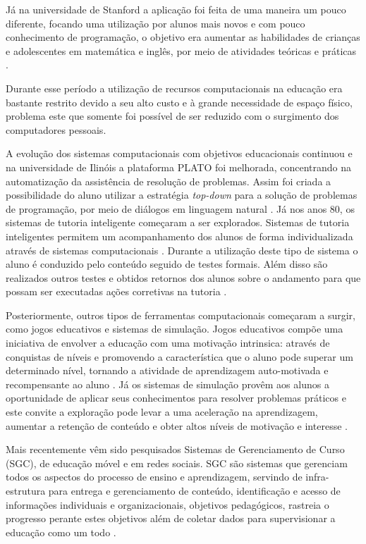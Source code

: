 Já na universidade de Stanford a aplicação foi feita de uma maneira um pouco diferente, focando uma utilização por alunos mais novos e com pouco conhecimento de programação, o objetivo era aumentar as habilidades de crianças e adolescentes em matemática e inglês, por meio de atividades teóricas e práticas \cite{chambers80}.

Durante esse período a utilização de recursos computacionais na educação era bastante restrito devido a seu alto custo e à grande necessidade de espaço físico, problema este que somente foi possível de ser reduzido com o surgimento dos computadores pessoais. 

A evolução dos sistemas computacionais com objetivos educacionais continuou e na universidade de Ilinóis a plataforma PLATO foi melhorada, concentrando na automatização da assistência de resolução de problemas. Assim foi criada a possibilidade do aluno utilizar a estratégia \emph{top-down} para a solução de problemas de programação, por meio de diálogos em linguagem natural \cite{danielson75}. Já nos anos 80, os sistemas de tutoria inteligente começaram a ser explorados. Sistemas de tutoria inteligentes permitem um acompanhamento dos alunos de forma individualizada através de sistemas computacionais \cite{bloom84}. Durante a utilização deste tipo de sistema o aluno é conduzido pelo conteúdo seguido de testes formais. Além disso são realizados outros testes e obtidos retornos dos alunos sobre o andamento para que possam ser executadas ações corretivas na tutoria \cite{bloom84}.

Posteriormente, outros tipos de ferramentas computacionais começaram a surgir, como jogos educativos e sistemas de simulação. Jogos educativos compõe uma iniciativa de envolver a educação com uma motivação intrinsica: através de conquistas de níveis e promovendo a característica que o aluno pode superar um determinado nível, tornando a atividade de aprendizagem auto-motivada e recompensante ao aluno \cite{amory99}. Já os sistemas de simulação provêm aos alunos a oportunidade de aplicar seus conhecimentos para resolver problemas práticos e este  convite a exploração pode levar a uma aceleração na aprendizagem, aumentar a retenção de conteúdo e obter altos níveis de motivação e interesse \cite{vandam07}.

Mais recentemente vêm sido pesquisados Sistemas de Gerenciamento de Curso (SGC), de educação móvel e em redes sociais. SGC são sistemas que gerenciam todos os aspectos do processo de ensino e aprendizagem, servindo de infra-estrutura para entrega e gerenciamento de conteúdo, identificação e acesso de informações individuais e organizacionais, objetivos pedagógicos, rastreia o progresso perante estes objetivos além de coletar dados para supervisionar a educação como um todo \cite{flescher02}.

